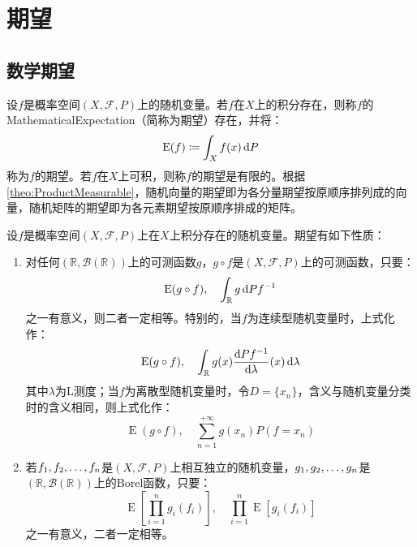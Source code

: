 \section{期望}

\subsection{数学期望}
\begin{definition}
	设$f$是概率空间$(X,\mathscr{F},P)$上的随机变量。若$f$在$X$上的积分存在，则称$f$的\gls{MathematicalExpectation}（简称为期望）存在，并将：
	\begin{equation*}
		\operatorname{E}(f)\coloneq\int_{X}f(x)\mathop{}\!\mathrm{d} P
	\end{equation*}
	称为$f$的期望。若$f$在$X$上可积，则称$f$的期望是有限的。根据\cref{theo:ProductMeasurable}，随机向量的期望即为各分量期望按原顺序排列成的向量，随机矩阵的期望即为各元素期望按原顺序排成的矩阵。
\end{definition}
\begin{property}\label{prop:Expectation}
	设$f$是概率空间$(X,\mathscr{F},P)$上在$X$上积分存在的随机变量。期望有如下性质：
	\begin{enumerate}
		\item 对任何$(\mathbb{R},\mathcal{B}(\mathbb{R}))$上的可测函数$g$，$g\circ f$是$(X,\mathscr{F},P)$上的可测函数，只要：
		\begin{equation*}
			\operatorname{E}(g\circ f),\quad\int_{\mathbb{R}}g\mathop{}\!\mathrm{d} Pf^{-1}
		\end{equation*}
		之一有意义，则二者一定相等。特别的，当$f$为连续型随机变量时，上式化作：
		\begin{equation*}
			\operatorname{E}(g\circ f),\quad\int_{\mathbb{R}}g(x)\frac{\mathop{}\!\mathrm{d} Pf^{-1}}{\mathop{}\!\mathrm{d}\lambda}(x)\mathop{}\!\mathrm{d}\lambda
		\end{equation*}
		其中$\lambda$为L测度；当$f$为离散型随机变量时，令$D=\{x_n\}$，含义与随机变量分类时的含义相同，则上式化作：
		\begin{equation*}
			\operatorname{E}(g\circ f),\quad\sum_{n=1}^{+\infty}g(x_n)P(f=x_n)
		\end{equation*}
		\item 若$f_1, f_2, \dots, f_{n}$是$(X,\mathscr{F},P)$上相互独立的随机变量，$g_1, g_2, \dots, g_{n}$是$(\mathbb{R},\mathcal{B}(\mathbb{R}))$上的Borel函数，只要：
		\begin{equation*}
			\operatorname{E}\left[\prod_{i=1}^{n}g_i(f_i)\right],\quad\prod_{i=1}^{n}\operatorname{E}[g_i(f_i)]
		\end{equation*}
		之一有意义，二者一定相等。
	\end{enumerate}
\end{property}
